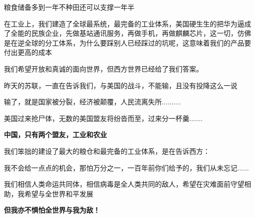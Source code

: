 \documentclass[UTF8, 11pt, oneside]{ctexart}
\newcommand{\zd}[1]{\textbf{\textcolor[RGB]{123,12,0}{#1}}} %
\begin{document}
粮食储备多到一年不种田还可以支撑一年半

在工业上，我们建造了全球最系统，最完备的工业体系，美国硬生生的把华为逼成了全能的民族企业，先做基站通讯服务，再做手机，再做麒麟芯片，这一切，仿佛是在逆全球的分工体系，为什么要踩别人已经踩过的坑呢，这意味着我们的产品要付出更高的成本

我们希望开放和真诚的面向世界，但西方世界已经给了我们答案。

昨天的苏联，一直在告诉我们，与美国的战斗，不能输，且没有投降这么一说

输了，就是国家被分裂，经济被颠覆，人民流离失所..........

美国过来抢尸体，无数的美国盟友将纷沓而至，过来分一杯羹.......

\zd{中国，只有两个盟友，工业和农业}

我们笨拙的建设了最大的粮仓和最完备的工业体系，是在告诉西方：

我不会给一点点的机会，那怕万分之一，一百年前你们给予的，我们从未忘记......

我们相信人类命运共同体，相信病毒是全人类共同的敌人，希望在灾难面前守望相助，我希望与全世界和平发展

\zd{但我亦不惧怕全世界与我为敌！}
\end{document}
